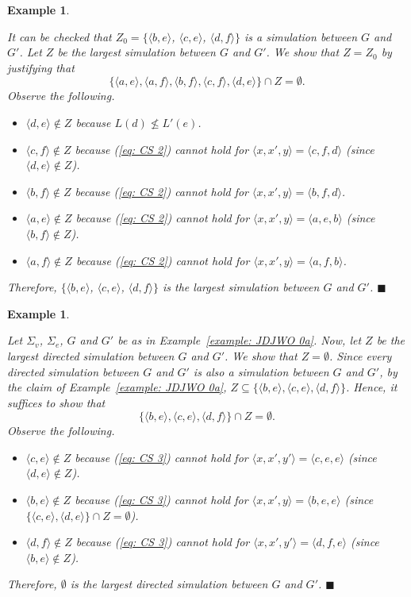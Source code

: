 \documentclass[11pt]{article}
\def\tuple#1{\langle#1\rangle}
\def\eqref#1{(\ref{#1})}
\newcommand{\myend}{\mbox{}\hfill{\footnotesize$\blacksquare$}}
\newcommand{\SV}{\Sigma_v}
\newcommand{\SE}{\Sigma_e}
\newtheorem{Example}[theorem]{Example}
\newenvironment{example}{\begin{Example}\begin{em}}{\end{em}\end{Example}}
\begin{document}
\begin{example}
It can be checked that $Z_0 = \{\tuple{b,e}$, $\tuple{c,e}$, $\tuple{d,f}\}$ is a simulation between $G$ and $G'$. 
Let $Z$ be the largest simulation between $G$ and $G'$. We show that $Z = Z_0$ by justifying that 
\[ \{\tuple{a,e}, \tuple{a,f}, \tuple{b,f}, \tuple{c,f}, \tuple{d,e}\} \cap Z = \emptyset. \] 
%	
Observe the following. 
\begin{itemize}
\item $\tuple{d,e} \notin Z$ because $L(d) \not\leq L'(e)$.
\item $\tuple{c,f} \notin Z$ because \eqref{eq: CS 2} cannot hold for $\tuple{x,x',y} = \tuple{c,f,d}$ (since $\tuple{d,e} \notin Z$). 
\item $\tuple{b,f} \notin Z$ because \eqref{eq: CS 2} cannot hold for $\tuple{x,x',y} = \tuple{b,f,d}$. 
\item $\tuple{a,e} \notin Z$ because \eqref{eq: CS 2} cannot hold for $\tuple{x,x',y} = \tuple{a,e,b}$ (since $\tuple{b,f} \notin Z$). 
\item $\tuple{a,f} \notin Z$ because \eqref{eq: CS 2} cannot hold for $\tuple{x,x',y} = \tuple{a,f,b}$. 
\end{itemize}
%
Therefore, $\{\tuple{b,e}$, $\tuple{c,e}$, $\tuple{d,f}\}$ is the largest simulation between $G$ and $G'$. 
\myend
\end{example}

\begin{example}\label{example: JDJWO 0b}
Let $\SV$, $\SE$, $G$ and $G'$ be as in Example~\ref{example: JDJWO 0a}.
Now, let $Z$ be the largest directed simulation between $G$ and $G'$. We show that $Z = \emptyset$. 
Since every directed simulation between $G$ and $G'$ is also a simulation between $G$ and $G'$, by the claim of Example~\ref{example: JDJWO 0a}, $Z \subseteq \{\tuple{b,e}, \tuple{c,e}, \tuple{d,f}\}$. Hence, it suffices to show that 
\[ \{\tuple{b,e}, \tuple{c,e}, \tuple{d,f}\} \cap Z = \emptyset. \]
%
Observe the following. 
\begin{itemize}
\item $\tuple{c,e} \notin Z$ because \eqref{eq: CS 3} cannot hold for $\tuple{x,x',y'} = \tuple{c,e,e}$ (since $\tuple{d,e} \notin Z$). 
\item $\tuple{b,e} \notin Z$ because \eqref{eq: CS 3} cannot hold for $\tuple{x,x',y} = \tuple{b,e,e}$ (since $\{\tuple{c,e},\tuple{d,e}\} \cap Z = \emptyset$). 
\item $\tuple{d,f} \notin Z$ because \eqref{eq: CS 3} cannot hold for $\tuple{x,x',y'} = \tuple{d,f,e}$ (since $\tuple{b,e} \notin Z$). 
\end{itemize}
Therefore, $\emptyset$ is the largest directed simulation between $G$ and $G'$. 
\myend
\end{example}
\end{document}
